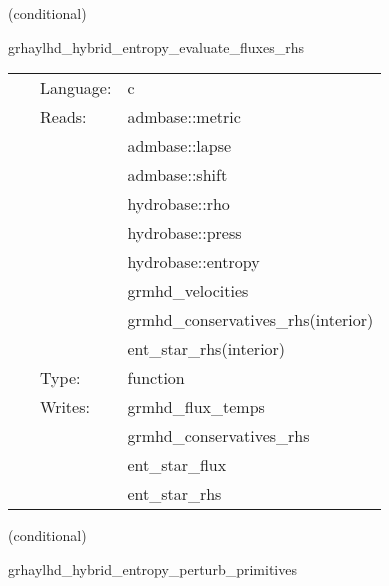 \documentclass{article}
\begin{document}
\vspace{5mm}

   (conditional) 

\hspace{5mm} grhaylhd\_hybrid\_entropy\_evaluate\_fluxes\_rhs 

\hspace{5mm}{\it entropy+hybrid version of grhaylhd\_evaluate\_fluxes\_rhs } 


\hspace{5mm}

 \begin{tabular*}{160mm}{cll} 
~ & Language:  & c \\ 
~ & Reads:  & admbase::metric \\ 
~& ~ &admbase::lapse\\ 
~& ~ &admbase::shift\\ 
~& ~ &hydrobase::rho\\ 
~& ~ &hydrobase::press\\ 
~& ~ &hydrobase::entropy\\ 
~& ~ &grmhd\_velocities\\ 
~& ~ &grmhd\_conservatives\_rhs(interior)\\ 
~& ~ &ent\_star\_rhs(interior)\\ 
~ & Type:  & function \\ 
~ & Writes:  & grmhd\_flux\_temps \\ 
~& ~ &grmhd\_conservatives\_rhs\\ 
~& ~ &ent\_star\_flux\\ 
~& ~ &ent\_star\_rhs\\ 
\end{tabular*} 


\vspace{5mm}

   (conditional) 

\hspace{5mm} grhaylhd\_hybrid\_entropy\_perturb\_primitives 

\hspace{5mm}{\it entropy+hybrid version of grhaylhd\_perturb\_primitives } 


\hspace{5mm}
\end{document}
